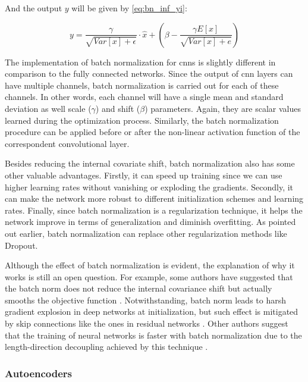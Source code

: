 And the output $y$ will be given by \autoref{eq:bn_inf_yi}:

\begin{equation}
\label{eq:bn_inf_yi}
y = \frac{\gamma}{\sqrt{Var[x] + \epsilon}} \cdot \hat{x} + \left( \beta - \frac{\gamma E[x]}{\sqrt{Var[x] + e}} \right)
\end{equation}

The implementation of batch normalization for \aclp{cnn} is slightly different in comparison to the fully connected networks. Since the output of \acs{cnn} layers can have multiple channels, batch normalization is carried out for each of these channels. In other words, each channel will have a single mean and standard deviation as well scale ($\gamma$) and shift ($\beta$) parameters. Again, they are scalar values learned during the optimization process. Similarly, the batch normalization procedure can be applied before or after the non-linear activation function of the correspondent convolutional layer.

Besides reducing the internal covariate shift, batch normalization also has some other valuable advantages. Firstly, it can speed up training since we can use higher learning rates without vanishing or exploding the gradients. Secondly, it can make the network more robust to different initialization schemes and learning rates. Finally, since batch normalization is a regularization technique, it helps the network improve in terms of generalization and diminish overfitting. As pointed out earlier, batch normalization can replace other regularization methods like Dropout.

Although the effect of batch normalization is evident, the explanation of why it works is still an open question. For example, some authors have suggested that the batch norm does not reduce the internal covariance shift but actually smooths the objective function \citep{santurkar2018does}. Notwithstanding, batch norm leads to harsh gradient explosion in deep networks at initialization, but such effect is mitigated by skip connections like the ones in residual networks \citep{yang2019mean}. Other authors suggest that the training of neural networks is faster with batch normalization due to the length-direction decoupling achieved by this technique \citep{kohler2019exponential}.

\subsubsection{Autoencoders}

